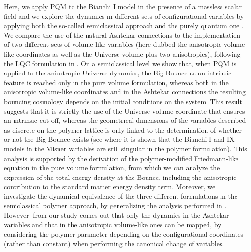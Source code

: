 \documentclass[aps,prd,twocolumn,nofootinbib,superscriptaddress]{revtex4-2}
\begin{document}
Here, we apply PQM to the Bianchi I model in the presence of a massless scalar field and we explore the dynamics in different sets of configurational variables by applying both the
so-called semiclassical approach and the purely quantum one
\cite{Pol}. We compare the use of the natural Ashtekar connections to the
implementation of two different sets of volume-like variables (here dubbed the  anisotropic volume-like coordinates as well as the
Universe volume plus two anisotropies),
following the LQC formulation in \cite{ashtekar2009,szulc}.
On a semiclassical level we show that, when PQM is applied to the anisotropic Universe
dynamics, the Big Bounce as an intrinsic
feature is reached only in the pure volume formulation, whereas both in the anisotropic volume-like coordinates and in the Ashtekar
connections the resulting bouncing cosmology depends on the initial conditions on the system. This result suggests that it is strictly the use of the Universe
volume coordinate that ensures an intrinsic cut-off, whereas the geometrical dimensions of the variables described as discrete on the polymer lattice is only linked to the determination of whether or not the Big Bounce exists (see \cite{EBianchiIX} where it is shown that the Bianchi I and IX models in the Misner variables are still singular in the polymer formulation). This analysis is supported by the derivation of the polymer-modified Friedmann-like equation in the pure volume formulation, from which we can analyze the expression of the total energy density at the Bounce, including the anisotropic contribution to the standard matter energy density term. Moreover, we investigate the dynamical equivalence of the three different formulations in the semiclassical polymer approach, by generalizing the analysis performed in \cite{EFG}. However, from our study comes out that only the dynamics in the Ashtekar variables and that in the anisotropic volume-like ones can be mapped, by considering the polymer parameter depending on the configurational coordinates (rather than constant) when performing the canonical change of variables.
\end{document}
